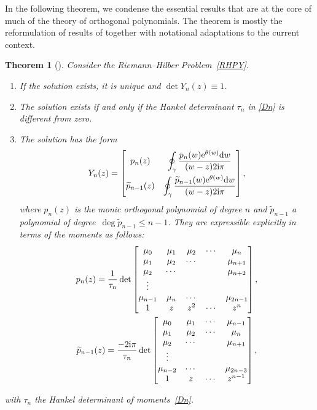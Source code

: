\documentclass[10pt,a4paper]{amsart}
\numberwithin{equation}{section}
\newtheorem{Theorem}{Theorem}[section]
\theoremstyle{definition}
\def \wt{ \widetilde }
\def \d{{\mathrm d}}
\def\be{\begin{equation}}
\def\ee{\end{equation}}
\begin{document}
In the following theorem, we condense the essential results that are at the core of much of the theory of orthogonal polynomials. The theorem is mostly the reformulation of results of \cite{FIK} together with notational adaptations to the current context.
\begin{Theorem}[\cite{FIK}]
\label{thmY}
Consider the Riemann--Hilber Problem~{\rm\ref{RHPY}}.
\begin{enumerate}
\item[$(1)$]
If the solution exists, it is unique and $\det Y_n(z) \equiv 1$.
\item[$(2)$] The solution exists if and only if the Hankel determinant $\tau_n$ in \eqref{Dn} is different from zero.
\item[$(3)$] The solution has the form
\be
\label{Ynsol}
Y_n(z) = \begin{bmatrix}
p_n(z) & \displaystyle \oint_{\gamma} \frac {p_n(w) {\rm e}^{\theta(w)} \d w}{(w-z)2{\rm i}\pi}
\vspace{1mm}\\
\wt p_{n-1}(z) & \displaystyle \oint_{\gamma} \frac {\wt p_{n-1}(w) {\rm e}^{\theta(w)} \d w}{(w-z)2{\rm i}\pi}
\end{bmatrix},
\ee
where $p_n(z)$ is the monic orthogonal polynomial of degree $n$ and $\wt p_{n-1}$ a polynomial of degree~${\deg \wt p_{n-1} \leq n-1}$. They are expressible explicitly in terms of the moments as follows:
\begin{gather}
p_n(z) = \frac 1{\tau_n} \det \begin{bmatrix}
\mu_0 &\mu_1 &\mu_2 &\cdots & \mu_n\\
\mu_1 &\mu_2 & \cdots &&\mu_{n+1}\\
\mu_2 & \cdots &&&\mu_{n+2}\\
\vdots\\
\mu_{n-1} & \mu_{n} & \cdots & &\mu_{2n-1}\\
1 & z & z^2 & \cdots & z^n
\end{bmatrix},
\label{pn}
\\
\wt p_{n-1}(z) = \frac {-2{\rm i}\pi} {\tau_n} \det \begin{bmatrix}
\mu_0 &\mu_1 &\cdots & \mu_{n-1}\\
\mu_1 &\mu_2 & \cdots &\mu_{n}\\
\mu_2 & \cdots &&\mu_{n+1}\\
\vdots\\
\mu_{n-2} & \cdots & &\mu_{2n-3}\\
1 & z & \cdots & z^{n-1}
\end{bmatrix}
\label{wtpn-1},
\end{gather}
\end{enumerate}
with $\tau_n$ the Hankel determinant of moments~\eqref{Dn}.
\end{Theorem}
\end{document}

